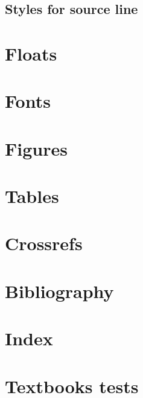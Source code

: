 \documentclass[output=book
	      ,nonflat
	      ,modfonts,
	      ,colorlinks
	      ,biblatex
	      ]{langsci/langscibook}
\begin{document}
\subsection{Styles for source line}




\section{Floats}
 
 

\section{Fonts}

%  
\section{Figures}\label{sec:tables}

\section{Tables}\label{sec:tables}

\section{Crossrefs}

\section{Bibliography}
 
\section{Index}
 

%  
\section{Textbooks tests}
 
 
 

\end{document}
